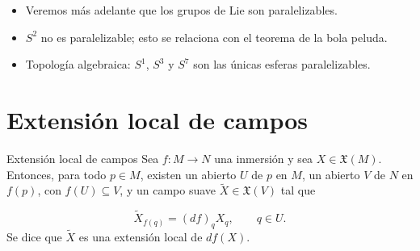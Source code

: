 \begin{bookexample}{}
\begin{itemize}
\item Veremos más adelante que los grupos de Lie son paralelizables.
\item $S^2$ no es paralelizable; esto se relaciona con el teorema de la bola peluda.
\item Topología algebraica: $S^1$, $S^3$ y $S^7$ son las únicas esferas paralelizables.
\end{itemize}
\end{bookexample}
\section{Extensión local de campos}
\begin{booktheorem}{Extensión local de campos}
Sea $f:M\to N$ una inmersión y sea $X\in\mathfrak X(M)$. Entonces, para todo $p\in M$, existen un abierto $U$ de $p$ en $M$, un abierto $V$ de $N$ en $f(p)$, con $f(U)\subseteq V$, y un campo suave $\widetilde X\in\mathfrak X(V)$ tal que

\[
\widetilde X_{f(q)}=(df)_qX_q,\qquad q\in U.
\]
Se dice que $\widetilde X$ es una extensión local de $df(X)$.

\end{booktheorem}
